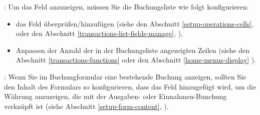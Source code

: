 \noindent
\Note{}: Um das Feld  anzuzeigen, müssen Sie die Buchungsliste wie folgt konfigurieren:
\begin{itemize}
	\item das Feld  überprüfen/hinzufügen (siehe den Abschnitt \vref{setup-operations-cells},  oder den Abschnitt \vref{transactions-list-fields-manage}, ),
	\item Anpassen der Anzahl der in der Buchungsliste angezeigten Zeilen (siehe den Abschnitt \vref{transactions-functions}  oder den Abschnitt \vref{home-menus-display} ).
\end{itemize}

\Note{}: Wenn Sie im Buchungformular eine bestehende Buchung anzeigen, sollten Sie den Inhalt des Formulars so konfigurieren, dass das Feld  hinzugefügt wird, um die Währung anzuzeigen, die mit der Ausgaben- oder Einnahmen-Bunchung verknüpft ist (siehe Abschnitt \vref{setup-form-content}, ).


